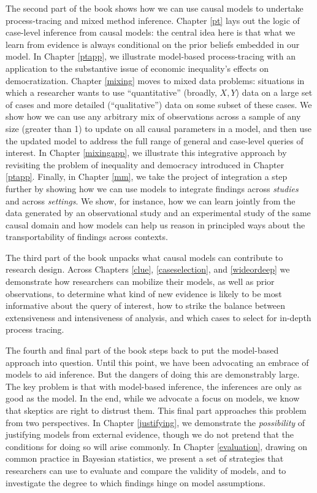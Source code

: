 \documentclass[
  12pt,
]{book}
\begin{document}
The second part of the book shows how we can use causal models to undertake process-tracing and mixed method inference. Chapter \ref{pt} lays out the logic of case-level inference from causal models: the central idea here is that what we learn from evidence is always conditional on the prior beliefs embedded in our model. In Chapter \ref{ptapp}, we illustrate model-based process-tracing with an application to the substantive issue of economic inequality's effects on democratization. Chapter \ref{mixing} moves to mixed data problems: situations in which a researcher wants to use ``quantitative'' (broadly, \(X,Y\)) data on a large set of cases and more detailed (``qualitative'') data on some subset of these cases. We show how we can use any arbitrary mix of observations across a sample of any size (greater than 1) to update on all causal parameters in a model, and then use the updated model to address the full range of general and case-level queries of interest. In Chapter \ref{mixingapp}, we illustrate this integrative approach by revisiting the problem of inequality and democracy introduced in Chapter \ref{ptapp}. Finally, in Chapter \ref{mm}, we take the project of integration a step further by showing how we can use models to integrate findings across \emph{studies} and across \emph{settings}. We show, for instance, how we can learn jointly from the data generated by an observational study and an experimental study of the same causal domain and how models can help us reason in principled ways about the transportability of findings across contexts.

The third part of the book unpacks what causal models can contribute to research design. Across Chapters \ref{clue}, \ref{caseselection}, and \ref{wideordeep} we demonstrate how researchers can mobilize their models, as well as prior observations, to determine what kind of new evidence is likely to be most informative about the query of interest, how to strike the balance between extensiveness and intensiveness of analysis, and which cases to select for in-depth process tracing.

The fourth and final part of the book steps back to put the model-based approach into question. Until this point, we have been advocating an embrace of models to aid inference. But the dangers of doing this are demonstrably large. The key problem is that with model-based inference, the inferences are only as good as the model. In the end, while we advocate a focus on models, we know that skeptics are right to distrust them. This final part approaches this problem from two perspectives. In Chapter \ref{justifying}, we demonstrate the \emph{possibility} of justifying models from external evidence, though we do not pretend that the conditions for doing so will arise commonly. In Chapter \ref{evaluation}, drawing on common practice in Bayesian statistics, we present a set of strategies that researchers can use to evaluate and compare the validity of models, and to investigate the degree to which findings hinge on model assumptions.
\end{document}

